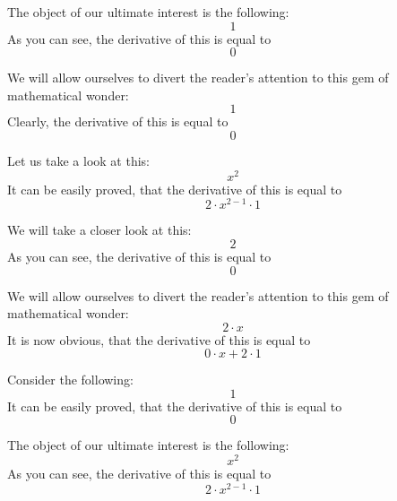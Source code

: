 \documentclass{article}
\begin{document}
The object of our ultimate interest is the following:
\begin{equation}
1 
\end{equation}
As you can see, the derivative of this is equal to
\begin{equation}
0 
\end{equation}

We will allow ourselves to divert the reader's attention to this gem of mathematical wonder:
\begin{equation}
1 
\end{equation}
Clearly, the derivative of this is equal to
\begin{equation}
0 
\end{equation}

Let us take a look at this:
\begin{equation}
x ^{2 } 
\end{equation}
It can be easily proved, that the derivative of this is equal to
\begin{equation}
2 \cdot x ^{2 - 1 } \cdot 1 
\end{equation}

We will take a closer look at this:
\begin{equation}
2 
\end{equation}
As you can see, the derivative of this is equal to
\begin{equation}
0 
\end{equation}

We will allow ourselves to divert the reader's attention to this gem of mathematical wonder:
\begin{equation}
2 \cdot x 
\end{equation}
It is now obvious, that the derivative of this is equal to
\begin{equation}
0 \cdot x + 2 \cdot 1 
\end{equation}

Consider the following:
\begin{equation}
1 
\end{equation}
It can be easily proved, that the derivative of this is equal to
\begin{equation}
0 
\end{equation}

The object of our ultimate interest is the following:
\begin{equation}
x ^{2 } 
\end{equation}
As you can see, the derivative of this is equal to
\begin{equation}
2 \cdot x ^{2 - 1 } \cdot 1 
\end{equation}
\end{document}
